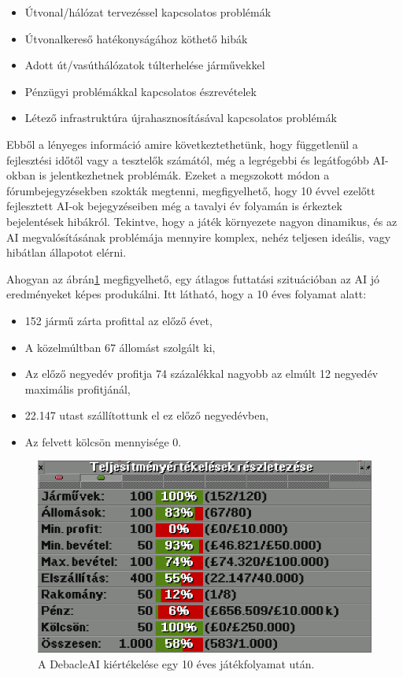 \begin{itemize}
	\item Útvonal/hálózat tervezéssel kapcsolatos problémák
	\item Útvonalkereső hatékonyságához köthető hibák
	\item Adott út/vasúthálózatok túlterhelése járművekkel
	\item Pénzügyi problémákkal kapcsolatos észrevételek
	\item Létező infrastruktúra újrahasznosításával kapcsolatos problémák
\end{itemize}

Ebből a lényeges információ amire következtethetünk, hogy függetlenül a fejlesztési időtől vagy a tesztelők számától, még a legrégebbi és legátfogóbb AI-okban is jelentkezhetnek problémák. Ezeket a megszokott módon a fórumbejegyzésekben szokták megtenni, megfigyelhető, hogy 10 évvel ezelőtt fejlesztett AI-ok bejegyzéseiben még a tavalyi év folyamán is érkeztek bejelentések hibákról. Tekintve, hogy a játék környezete nagyon dinamikus, és az AI megvalósításának problémája mennyire komplex, nehéz teljesen ideális, vagy hibátlan állapotot elérni.

Ahogyan az ábrán\ref{fig:atlag} megfigyelhető, egy átlagos futtatási szituációban az AI jó eredményeket képes produkálni. Itt látható, hogy a 10 éves folyamat alatt:

\begin{itemize}
	\item 152 jármű zárta profittal az előző évet,
	\item A közelmúltban 67 állomást szolgált ki,
	\item Az előző negyedév profitja 74 százalékkal nagyobb az elmúlt 12 negyedév maximális profitjánál,
	\item 22.147 utast szállítottunk el ez előző negyedévben,
	\item Az felvett kölcsön mennyisége 0.
\end{itemize}

\begin{figure}
	\centering
	\includegraphics[scale=0.7]{images/atlag.png}
	\caption{A DebacleAI kiértékelése egy 10 éves játékfolyamat után.}
	\label{fig:atlag}
\end{figure}

